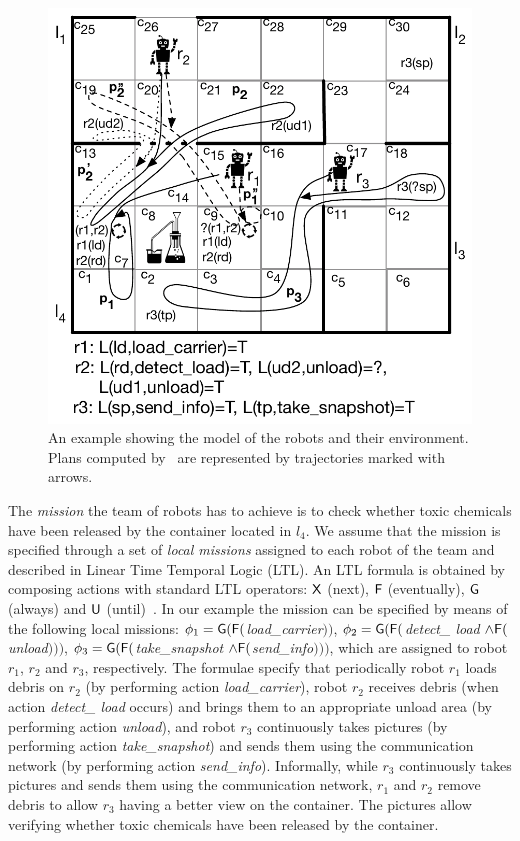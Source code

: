 \begin{figure}[!t]
\begin{center}
\includegraphics[width=0.9\linewidth]{Figures/motivatingExample.pdf}
\caption{An example showing the model of the robots and their environment. Plans computed by \toolName\ are represented by trajectories marked with arrows.}
\label{fig:example1}
\end{center}
\end{figure}

The \emph{mission}  the team of robots has to achieve is to check whether toxic chemicals have been released by the container located in $l_4$.
We assume that the mission is specified through a set of \emph{local missions} assigned to each robot of the team and described in Linear Time Temporal Logic  (LTL).
An LTL formula is obtained by composing actions with standard LTL operators: $\mathsf{X}$ (next), $\mathsf{F}$  (eventually),  $\mathsf{G}$ (always) and $\mathsf{U}$ (until)~\cite{pnueli1977temporal}. 
In our example the mission  can be specified by means of the following local missions: $\phi_1=\mathsf{G} (\mathsf{F} ($\emph{load\_carrier}$))$, 
$\phi_2=\mathsf{G} (\mathsf{F}($\emph{detect\_ load} $ \wedge \mathsf{F} ($\emph{unload}$)))$, 
 $\phi_3=\mathsf{G} ( \mathsf{F} ($\emph{take\_snapshot} $\wedge \mathsf{F} ($\emph{send\_info}$)))$, which are assigned to robot $r_1$, $r_2$ and $r_3$, respectively.
The formulae specify that periodically robot $r_1$ loads debris on $r_2$ (by performing action \emph{load\_carrier}), robot $r_2$ receives debris (when action \emph{detect\_ load} occurs)  and brings them to an appropriate unload area (by performing action \emph{unload}), and robot $r_3$ continuously takes pictures (by performing action \emph{take\_snapshot}) and sends them using the communication network (by performing action \emph{send\_info}).
Informally, while $r_3$ continuously takes pictures and sends them using the communication network, $r_1$ and $r_2$ remove debris to allow $r_3$ having a better view on the container.
The pictures allow verifying whether toxic chemicals have been released by the container.



